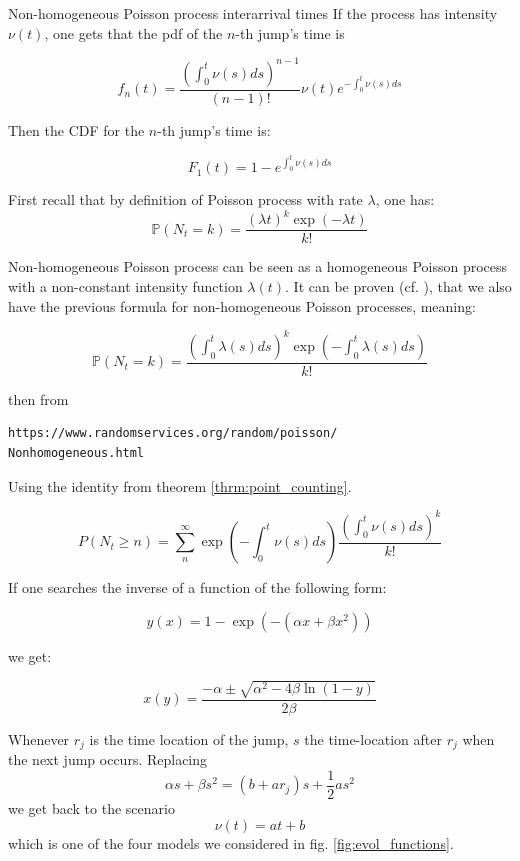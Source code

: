 \begin{theoreme}{Non-homogeneous Poisson process interarrival times}
If the process has intensity $\nu(t)$, one gets that the pdf of the $n$-th jump's time is 

$$
f_n(t)  = \frac {\left ( \int_0^t \nu(s) ds \right )^{n-1}}{(n-1)!} \nu(t) e^{-  \int_0^t \nu(s) ds }
$$

Then the CDF for the $n$-th jump's time is:

$$
F_1(t) = 1 - e^{  \int_0^t \nu(s) ds } 
$$

\end{theoreme}


\begin{demo}{}{}
First recall that by definition of Poisson process with rate $\lambda$, one has:
$$
\mathbb P(N_t = k) = \frac { (\lambda t)^k \exp(- \lambda t ) }{k !}$$

Non-homogeneous Poisson process can be seen as a homogeneous Poisson process with a non-constant intensity function $\lambda (t)$. It can be proven (cf. \cite{Veraart}), that we also have the previous formula for non-homogeneous Poisson processes, meaning:

$$
\mathbb P(N_t = k) = \frac { \left ( \int_0^t \lambda(s) ds \right )^k \exp \left ( - \int_0^t \lambda(s) ds \right )  }{k !}$$

then from \begin{verbatim}
https://www.randomservices.org/random/poisson/
Nonhomogeneous.html
\end{verbatim}

Using the identity from theorem \ref{thrm:point_counting}.

$$ P( N_t \geq n ) = \sum_n^{\infty} \exp \left ( - \int_0^t \nu(s) ds \right ) \frac{ \left ( \int_0^t \nu(s) ds \right ) ^k }{k !} 
$$
\end{demo}


\begin{ajoutationV}{}{}
If one searches the inverse of a function of the following form:

$$ y(x) = 1 - \exp ( - (\alpha x + \beta x^2) ) $$

we get:

$$ x(y) = \frac{- \alpha \pm \sqrt{\alpha^2 - 4 \beta \ln(1-y) }  }{2 \beta}$$

Whenever $r_j$ is the time location of the jump, $s$ the time-location after $r_j$ when the next jump occurs. Replacing $$\alpha s + \beta s^2 = ( b + a r_j ) s + \frac 1 2 a s^2 $$ 
we get back to the scenario $$ \nu(t) =  a t + b $$ which is one of the four models we considered in fig. \ref{fig:evol_functions}.
\end{ajoutationV}


